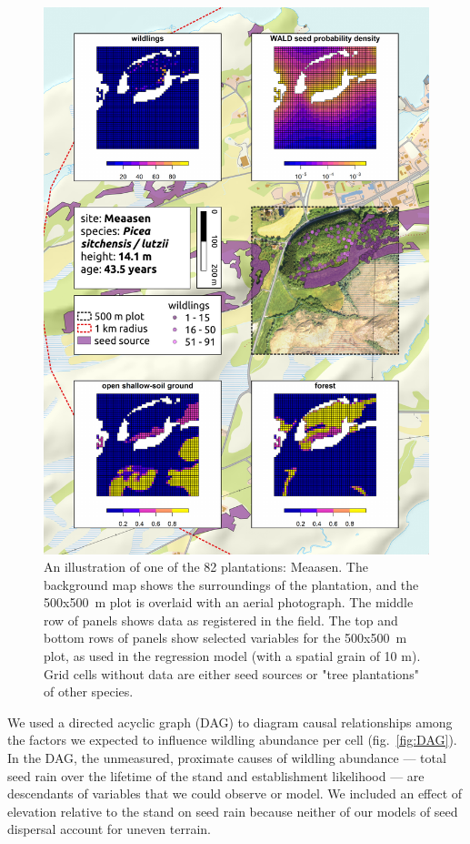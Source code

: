 \documentclass[
]{article}
\begin{document}
\begin{figure}
\includegraphics[width=0.9\linewidth]{figures/site-example/site-example} \caption{An illustration of one of the 82 plantations: Meaasen. The background map shows the surroundings of the plantation, and the 500x500 m plot is overlaid with an aerial photograph. The middle row of panels shows data as registered in the field. The top and bottom rows of panels show selected variables for the 500x500 m plot, as used in the regression model (with a spatial grain of 10 m). Grid cells without data are either seed sources or "tree plantations" of other species.}\label{fig:site-example}
\end{figure}

We used a directed acyclic graph (DAG) to diagram causal relationships among the factors we expected to influence wildling abundance per cell (fig.~\ref{fig:DAG}).
In the DAG, the unmeasured, proximate causes of wildling abundance --- total seed rain over the lifetime of the stand and establishment likelihood --- are descendants of variables that we could observe or model.
We included an effect of elevation relative to the stand on seed rain because neither of our models of seed dispersal account for uneven terrain.
\end{document}
